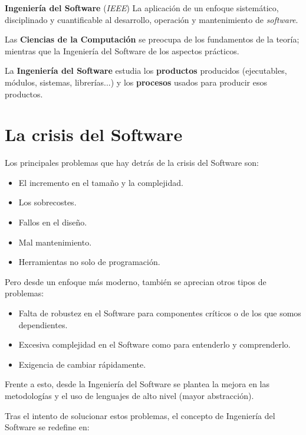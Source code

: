 
\textbf{Ingeniería del Software} (\emph{IEEE}) La aplicación de un
enfoque sistemático, disciplinado y cuantificable al desarrollo,
operación y mantenimiento de \emph{software}.\par
Las \textbf{Ciencias de la Computación} se preocupa de los fundamentos
de la teoría; mientras que la Ingeniería del Software de los aspectos
prácticos.\par
La \textbf{Ingeniería del Software} estudia los \textbf{productos}
producidos (ejecutables, módulos, sistemas, librerías...) y los
\textbf{procesos} usados para producir esos productos.

\section{La crisis del Software}
\label{sec:crisis}

Los principales problemas que hay detrás de la crisis del Software
son:
\begin{itemize}[noitemsep]
\item El incremento en el tamaño y la complejidad.
\item Los sobrecostes.
\item Fallos en el diseño.
\item Mal mantenimiento.
\item Herramientas no solo de programación.
\end{itemize}

Pero desde un enfoque más moderno, también se aprecian otros tipos de
problemas:

\begin{itemize}[noitemsep]
\item Falta de robustez en el Software para componentes críticos o de
  los que somos dependientes.
\item Excesiva complejidad en el Software como para entenderlo y
  comprenderlo.
\item Exigencia de cambiar rápidamente.
\end{itemize}

Frente a esto, desde la Ingeniería del Software se plantea la mejora
en las metodologías y el uso de lenguajes de alto nivel (mayor
abstracción).

Tras el intento de solucionar estos problemas, el concepto de Ingeniería
del Software se redefine en:\par

